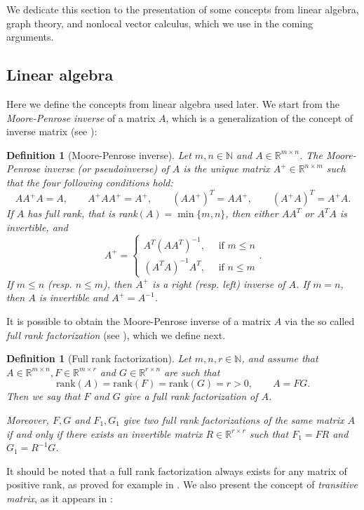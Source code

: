 \documentclass[a4paper,11pt,oneside]{amsart}
\newtheorem{definition}[theorem]{Definition}
\newcommand{\R}{{\mathbb R}}
\newcommand{\N}{{\mathbb N}}
\begin{document}
We dedicate this section to the presentation of some concepts from linear algebra, graph theory, and nonlocal vector calculus, which we use in the coming arguments.

\subsection{Linear algebra}

Here we define the concepts from linear algebra used later. We start from the \emph{Moore-Penrose inverse} of a matrix $A$, which is a generalization of the concept of inverse matrix (see \cite{Pen55}):

\begin{definition}[Moore-Penrose inverse] Let $m,n\in\N$ and $A\in \R^{m\times n}$. The \emph{Moore-Penrose inverse} (or \emph{pseudoinverse}) of $A$ is the unique matrix $A^+\in\R^{n\times m}$ such that the four following conditions hold:
    $$AA^+A=A, \qquad A^+AA^+=A^+, \qquad (AA^+)^T=AA^+, \qquad (A^+A)^T=A^+A.$$
If $A$ has full rank, that is rank$(A)=\min\{m,n\}$, then either $AA^T$ or $A^TA$ is invertible, and
$$A^+=\begin{cases}
    A^T(AA^T)^{-1} , \quad\mbox{ if } m\leq n  \\ (A^TA)^{-1}A^T, \quad\mbox{ if } n\leq m
\end{cases}.$$
If $m\leq n$ (resp. $n\leq m$), then $A^+$ is a right (resp. left) inverse of $A$. If $m=n$, then $A$ is invertible and $A^+=A^{-1}$.
\end{definition} 

It is possible to obtain the Moore-Penrose inverse of a matrix $A$ via the so called \emph{full rank factorization} (see \cite[Theorems 1 and 2]{PO99}), which we define next.

\begin{definition}[Full rank factorization] Let $m,n,r\in\N$, and assume that $A\in \R^{m\times n}, F\in \R^{m\times r}$ and $G\in \R^{r\times n}$ are such that 
$$ \mbox{rank}(A)=\mbox{rank}(F)=\mbox{rank}(G)=r>0, \qquad A=FG.$$
Then we say that $F$ and $G$ give a \emph{full rank factorization} of $A$. 

Moreover, $F,G$ and $F_1,G_1$ give two full rank factorizations of the same matrix $A$ if and only if there exists an invertible matrix $R\in \R^{r\times r}$ such that $F_1 = FR$ and $G_1 = R^{-1}G$.
\end{definition} 

It should be noted that a full rank factorization always exists for any matrix of positive rank, as proved for example in \cite[Section 3]{PO99}. We also present the concept of \emph{transitive matrix}, as it appears in \cite{FRS99}:
\end{document}
